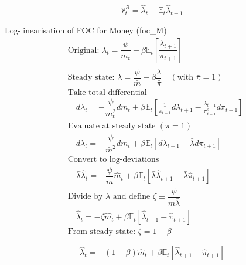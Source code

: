 \documentclass[11pt,preprint]{elsarticle}
\numberwithin{equation}{section}
\numberwithin{figure}{section}
\numberwithin{table}{section}
\begin{document}
\begin{equation}\label{foc_B_linearised_app}
\boxed{\hat{r}^B_t = \hat{\lambda}_t - \mathbb{E}_t \hat{\lambda}_{t+1}}
\end{equation}

Log-linearisation of FOC for Money (foc\_M) \begin{align*}
& \text{Original: } \lambda_t = \dfrac{\psi}{m_t} + \beta \mathbb{E}_t \left[ \dfrac{\lambda_{t+1}}{\pi_{t+1}} \right] \\[6pt]
& \text{Steady state: } \bar{\lambda} = \dfrac{\psi}{\bar{m}} + \beta \dfrac{\bar{\lambda}}{\bar{\pi}} \quad (\text{with } \bar{\pi}=1) \\[6pt]
& \text{Take total differential} \\
& \quad d\lambda_t = -\dfrac{\psi}{m_t^2} dm_t + \beta \mathbb{E}_t \left[ \frac{1}{\pi_{t+1}} d\lambda_{t+1} - \frac{\lambda_{t+1}}{\pi_{t+1}^2} d\pi_{t+1} \right] \\[6pt]
& \text{Evaluate at steady state } (\bar{\pi}=1) \\
& \quad d\lambda_t = -\dfrac{\psi}{\bar{m}^2} dm_t + \beta \mathbb{E}_t \left[ d\lambda_{t+1} - \bar{\lambda} d\pi_{t+1} \right] \\[6pt]
& \text{Convert to log-deviations} \\
& \quad \bar{\lambda} \hat{\lambda}_t = -\dfrac{\psi}{\bar{m}} \hat{m}_t + \beta \mathbb{E}_t \left[ \bar{\lambda} \hat{\lambda}_{t+1} - \bar{\lambda} \hat{\pi}_{t+1} \right] \\[6pt]
& \text{Divide by } \bar{\lambda} \text{ and define } \zeta \equiv \dfrac{\psi}{\bar{m}\bar{\lambda}} \\
& \quad \hat{\lambda}_t = -\zeta \hat{m}_t + \beta \mathbb{E}_t \left[ \hat{\lambda}_{t+1} - \hat{\pi}_{t+1} \right] \\[6pt]
& \text{From steady state: } \zeta = 1 - \beta
\end{align*}

\begin{equation}\label{foc_M_linearised_app}
\boxed{\hat{\lambda}_t = -(1 - \beta) \hat{m}_t + \beta \mathbb{E}_t \left[ \hat{\lambda}_{t+1} - \hat{\pi}_{t+1} \right]}
\end{equation}
\end{document}
